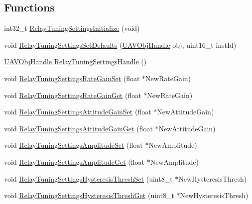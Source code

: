 \subsection*{\-Functions}
\begin{DoxyCompactItemize}
\item 
int32\-\_\-t \hyperlink{group___relay_tuning_settings_gad8758a1d15aa3ac84f91b9287863e035}{\-Relay\-Tuning\-Settings\-Initialize} (void)
\item 
void \hyperlink{group___relay_tuning_settings_ga290ce0f0a634a415e8e23933259002de}{\-Relay\-Tuning\-Settings\-Set\-Defaults} (\hyperlink{targets_2_u_a_v_objects_2inc_2uavobjectmanager_8h_a279053e22be53ce9f895043aaeb91e3b}{\-U\-A\-V\-Obj\-Handle} obj, uint16\-\_\-t inst\-Id)
\item 
\hyperlink{targets_2_u_a_v_objects_2inc_2uavobjectmanager_8h_a279053e22be53ce9f895043aaeb91e3b}{\-U\-A\-V\-Obj\-Handle} \hyperlink{group___relay_tuning_settings_ga9f3d733c3628421b3cdc7e9963fb005a}{\-Relay\-Tuning\-Settings\-Handle} ()
\item 
void \hyperlink{group___relay_tuning_settings_ga5d50d5457eb4184fdd4f4f8b3385639f}{\-Relay\-Tuning\-Settings\-Rate\-Gain\-Set} (float $\ast$\-New\-Rate\-Gain)
\item 
void \hyperlink{group___relay_tuning_settings_ga14fffffa74f62c30450a9a18dad3724d}{\-Relay\-Tuning\-Settings\-Rate\-Gain\-Get} (float $\ast$\-New\-Rate\-Gain)
\item 
void \hyperlink{group___relay_tuning_settings_gaf34a9010945dca29518ae04a3daf6bec}{\-Relay\-Tuning\-Settings\-Attitude\-Gain\-Set} (float $\ast$\-New\-Attitude\-Gain)
\item 
void \hyperlink{group___relay_tuning_settings_ga4589e6308c8380ba5bed36a0e76b2f66}{\-Relay\-Tuning\-Settings\-Attitude\-Gain\-Get} (float $\ast$\-New\-Attitude\-Gain)
\item 
void \hyperlink{group___relay_tuning_settings_ga8316245f789c5484769b63a8b34e780b}{\-Relay\-Tuning\-Settings\-Amplitude\-Set} (float $\ast$\-New\-Amplitude)
\item 
void \hyperlink{group___relay_tuning_settings_gaf9783895329099c223c175398725e8fd}{\-Relay\-Tuning\-Settings\-Amplitude\-Get} (float $\ast$\-New\-Amplitude)
\item 
void \hyperlink{group___relay_tuning_settings_gacbe5a5d0896ec0574024685098e65a1d}{\-Relay\-Tuning\-Settings\-Hysteresis\-Thresh\-Set} (uint8\-\_\-t $\ast$\-New\-Hysteresis\-Thresh)
\item 
void \hyperlink{group___relay_tuning_settings_gab37a8309b9e31c586c0a94fdc6700e76}{\-Relay\-Tuning\-Settings\-Hysteresis\-Thresh\-Get} (uint8\-\_\-t $\ast$\-New\-Hysteresis\-Thresh)

\end{DoxyCompactItemize}
